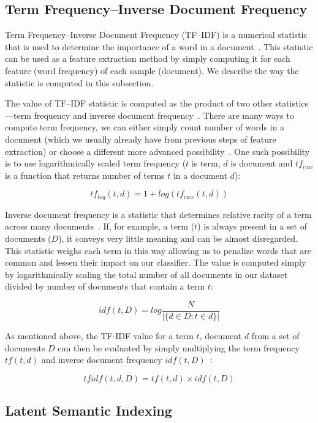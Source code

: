 \subsection{Term Frequency--Inverse Document Frequency}

Term Frequency--Inverse Document Frequency (TF--IDF) is a numerical statistic that is used to determine the importance of a word in a document~\cite{tfidf2014}. This statistic can be used as a feature extraction method by simply computing it for each feature (word frequency) of each sample (document). We describe the way the statistic is computed in this subsection.

The value of TF--IDF statistic is computed as the product of two other statistics---term frequency and inverse document frequency~\cite{tfidf2014}. There are many ways to compute term frequency, we can either simply count number of words in a document (which we usually already have from previous steps of feature extraction) or choose a different more advanced possibility~\cite{manning2008introduction}. One such possibility is to use logarithmically scaled term frequency ($t$ is term, $d$ is document and $tf_{raw}$ is a function that returns number of terms $t$ in a document $d$):

$$tf_{log}(t,d) = 1 + log(tf_{raw}(t,d))$$

Inverse document frequency is a statistic that determines relative rarity of a term across many documents~\cite{tfidf2014}. If, for example, a term ($t$) is always present in a set of documents ($D$), it conveys very little meaning and can be almost disregarded. This statistic weighs each term in this way allowing us to penalize words that are common and lessen their impact on our classifier. The value is computed simply by logarithmically scaling the total number of all documents in our dataset divided by number of documents that contain a term $t$:

$$idf(t, D) = log \frac{N}{|\{d \in D : t \in d\}|}$$

As mentioned above, the TF-IDF value for a term $t$, document $d$ from a set of documents $D$ can then be evaluated by simply multiplying the term frequency $tf(t,d)$ and inverse document frequency $idf(t,D)$~\cite{manning2008introduction}:

$$tfidf(t,d,D) = tf(t,d) \times idf(t,D)$$

\subsection{Latent Semantic Indexing}

